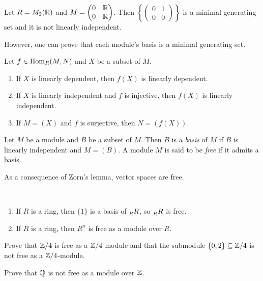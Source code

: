\begin{example}
Let $R=M_2(\mathbb{R})$ and $M=\begin{pmatrix}
        0&\mathbb{R}\\
        0&\mathbb{R} 
    \end{pmatrix}$. Then $\left\{\begin{pmatrix}0&1\\0&0\end{pmatrix}\right\}$ is a minimal generating 
    set and it is not linearly independent. 
\end{example}

However, one can prove that each module's basis is a minimal generating set. 

\begin{exercise}
\label{xca:LI}
    Let $f\in\operatorname{Hom}_R(M,N)$ and $X$ be a subset of $M$. 
    \begin{enumerate}
        \item If $X$ is linearly dependent, then $f(X)$ is linearly dependent.
        \item If $X$ is linearly independent and $f$ is injective, then $f(X)$ is linearly independent. 
        \item If $M=(X)$ and $f$ is surjective, then $N=(f(X))$. 
    \end{enumerate}
\end{exercise}

\begin{definition}
    Let $M$ be a module and $B$ be a subset of $M$. Then $B$ is a \emph{basis} of $M$ if
    $B$ is linearly independent and $M=(B)$. A module $M$ is said to be \emph{free} if it admits a basis.   
\end{definition}

As a consequence of Zorn's lemma, 
vector spaces are free. 

\begin{example}\
\begin{enumerate}
    \item If $R$ is a ring, then $\{1\}$ is a basis of $\prescript{}{R}{R}$, so $\prescript{}{R}{R}$ is free.
    \item If $R$ is a ring, then $R^n$ is free as a module over $R$. 
\end{enumerate}
\end{example}

\begin{exercise}
    Prove that $\mathbb{Z}/4$ is free as a $\mathbb{Z}/4$ module and that the submodule 
    $\{0,2\}\subseteq \mathbb{Z}/4$ is not free as a $\mathbb{Z}/4$-module.
\end{exercise}
\begin{exercise}
    Prove that $\mathbb{Q}$ is not free as a module over $\mathbb{Z}$. 
\end{exercise}

